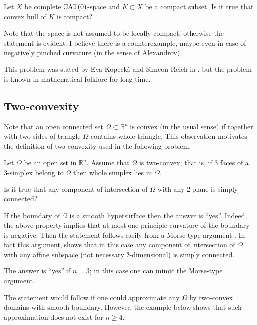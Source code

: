 \begin{pr}
Let $X$ be complete $\mathop{\rm CAT}(0)$-space and $K\subset X$ be a compact subset.
Is it true that convex hull of $K$ is compact?
\end{pr}


Note that the space is not assumed to be locally compact; otherwise the statement is evident.
I believe there is a counterexample, maybe even in case of negatively pinched curvature (in the sense of Alexandrov).

This problem was stated by Eva Kopeck\'a and Simeon Reich in \cite[see][]{kopecka-reich}, 
but the problem is known in mathematical folklore for long time. 



\subsection*{Two-convexity}
\label{Two-convexity}

Note that an open connected set $\Omega\subset\mathbb R^n$ is convex (in the usual sense) if together with two sides of triangle $\Omega$ contains whole triangle.
This observation motivates the definition of two-convexity used in the following problem.


\begin{pr}
Let $\Omega$ be an open set in $\mathbb R^n$.
Assume that $\Omega$ is two-convex; that is, if 3 faces of a 3-simplex belong to $\Omega$ then whole simplex lies in $\Omega$.

Is it true that any component of intersection of $\Omega$ with any 2-plane is simply connected?
\end{pr}


If the boundary of $\Omega$ is a smooth hypersurface then the answer is ``yes''.
Indeed, the above property implies that at most one principle curvature of the boundary is negative.
Then the statement follows easily from a Morse-type argument \cite[see Lefschetz theorem in Section~$\tfrac12$ in][]{gromov-SGMC}.
In fact this argument, shows that in this case any component of intersection of $\Omega$ with any affine subspace (not necessary 2-dimensional) is simply connected.

The answer is ``yes'' if $n=3$; in this case one can mimic the Morse-type argument.

The statement would follow if one could approximate any $\Omega$ by two-convex domains with smooth boundary. However, the example below shows that such approximation does not exist for $n\ge 4$.



